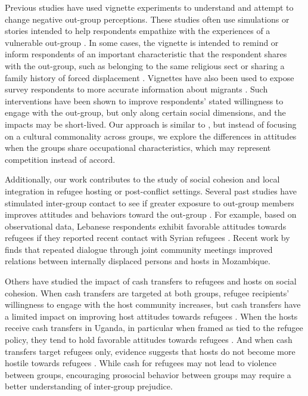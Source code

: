 \documentclass[a4paper,12pt]{article}
\begin{document}
Previous studies have used vignette experiments to understand and attempt to change negative out-group perceptions. These studies often use simulations or stories intended to help respondents empathize with the experiences of a vulnerable out-group \citep{rodriguez2021attitudes, adida2018perspective,  cattaneo2021turning, simonovits2018seeing, chatruc2024}. In some cases, the vignette is intended to remind or inform respondents of an important characteristic that the respondent shares with the out-group, such as belonging to the same religious sect \citep{lazarev2017brother} or sharing a family history of forced displacement \citep{dinas2021family}. Vignettes have also been used to expose survey respondents to more accurate information about migrants \citep{blinder2020going, grigorieff2020does, haaland2020labor, hopkins2019muted, facchini2022countering}. Such interventions have been shown to improve respondents' stated willingness to engage with the out-group, but only along certain social dimensions, and the impacts may be short-lived. Our approach is similar to \cite{lazarev2017brother}, but instead of focusing on a cultural commonality across groups, we explore the differences in attitudes when the groups share occupational characteristics, which may represent competition instead of accord. 

Additionally, our work contributes to the study of social cohesion and local integration in refugee hosting or post-conflict settings.  Several past studies have stimulated inter-group contact  to see if greater exposure to out-group members improves attitudes and behaviors toward the out-group \citep{lowe2021, mousa2020building, scacco2018can, betts2023refugees}. For example, based on observational data, Lebanese respondents exhibit favorable attitudes towards refugees if they reported recent contact with Syrian refugees \citep{ghoshn2019}. Recent work by \cite{barros2023power} finds that repeated dialogue through joint community meetings improved relations between internally displaced persons and hosts in Mozambique. 

Others have studied the impact of cash transfers to refugees and hosts on social cohesion. When cash transfers are targeted at both groups, refugee recipients' willingness to engage with the host community increases, but cash transfers have a limited impact on improving host attitudes towards refugees \citep{valli2019economic}. When the hosts receive cash transfers in Uganda, in particular when framed as tied to the refugee policy, they tend to hold favorable attitudes towards refugees \citep{baseler2022can}. And when cash transfers target refugees only, evidence suggests that hosts do not become more hostile towards refugees \citep{lehmann2020}.  While cash for refugees may not lead to violence between groups, encouraging prosocial behavior between groups may require a better understanding of inter-group prejudice.  
\end{document}
